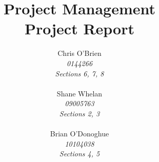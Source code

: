 \documentclass[a4paper,12pt,fleqn]{report}
\begin{document}
\title{Project Management  \\ Project Report}
\author{Chris O'Brien \\ \textit{0144266} \\ \textit{Sections 6, 7, 8}\\ \\ Shane Whelan \\ \textit{09005763} \\ \textit{Sections 2, 3}\\ \\ Brian O'Donoghue \\ \textit{10104038} \\ \textit{Sections 4, 5} \\}
\maketitle  
%
%
\tableofcontents

%
%
\listoffigures

%
%
\listoftables









\printbibliography[title={References}]
\appendix
  
\end{document}
